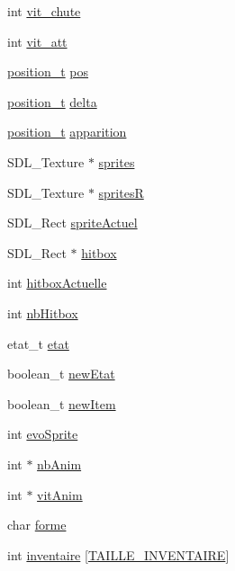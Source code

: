\begin{DoxyCompactItemize}
int \hyperlink{structpersonnage__s_a8e340f828bfffa2c47269e315609ed01}{vit\+\_\+chute}
\item 
int \hyperlink{structpersonnage__s_a0022973bab638a02774a19710cedcd17}{vit\+\_\+att}
\item 
\hyperlink{structposition__s}{position\+\_\+t} \hyperlink{structpersonnage__s_adea4789f8b55587ec092f3a32b7b1964}{pos}
\item 
\hyperlink{structposition__s}{position\+\_\+t} \hyperlink{structpersonnage__s_a09fb83af37953227050f9ced0410f032}{delta}
\item 
\hyperlink{structposition__s}{position\+\_\+t} \hyperlink{structpersonnage__s_a60ba887e657e6cdbdde28b63ade38709}{apparition}
\item 
S\+D\+L\+\_\+\+Texture $\ast$ \hyperlink{structpersonnage__s_a97da32596524755cba3ba76782ab0205}{sprites}
\item 
S\+D\+L\+\_\+\+Texture $\ast$ \hyperlink{structpersonnage__s_a15f9d1c9ce3e18fc10bb0ef94b38cc07}{spritesR}
\item 
S\+D\+L\+\_\+\+Rect \hyperlink{structpersonnage__s_afa75822afebdaf61725b7f87c86d5922}{sprite\+Actuel}
\item 
S\+D\+L\+\_\+\+Rect $\ast$ \hyperlink{structpersonnage__s_a2bb08ca974115a4394ffca5e7e6a3df6}{hitbox}
\item 
int \hyperlink{structpersonnage__s_adbf4ac9e2b3d716bd5fdc179c865cace}{hitbox\+Actuelle}
\item 
int \hyperlink{structpersonnage__s_a4f0dc729152bf8aaeefcb26ab6714aee}{nb\+Hitbox}
\item 
etat\+\_\+t \hyperlink{structpersonnage__s_a2d91f0a1a2e44164875be806c7a456cc}{etat}
\item 
boolean\+\_\+t \hyperlink{structpersonnage__s_ad9c2e07633c2a40855b169b4b677009f}{new\+Etat}
\item 
boolean\+\_\+t \hyperlink{structpersonnage__s_a3769403f861b056206cedf16e9e21b7d}{new\+Item}
\item 
int \hyperlink{structpersonnage__s_a47750ce89c5dcdb6844e0a98afd5fd75}{evo\+Sprite}
\item 
int $\ast$ \hyperlink{structpersonnage__s_a05aa3037a7469f58464094d2bd2d683a}{nb\+Anim}
\item 
int $\ast$ \hyperlink{structpersonnage__s_af44ce58e7c6ca78f9ceff803bb8bb931}{vit\+Anim}
\item 
char \hyperlink{structpersonnage__s_a1f1eb200420640259201a84300bccf7e}{forme}
\item 
int \hyperlink{structpersonnage__s_a0aefe070eb6c9c73fe6a40c909d2dc30}{inventaire} \mbox{[}\hyperlink{structs_8h_a5fdcc1659ee790f8bdd196e7745ab403}{T\+A\+I\+L\+L\+E\+\_\+\+I\+N\+V\+E\+N\+T\+A\+I\+RE}\mbox{]}

\end{DoxyCompactItemize}
